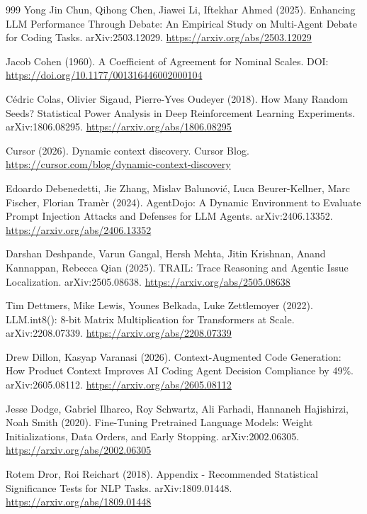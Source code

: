 \begin{thebibliography}{999}
 Yong Jin Chun, Qihong Chen, Jiawei Li, Iftekhar Ahmed (2025). Enhancing LLM Performance Through Debate: An Empirical Study on Multi-Agent Debate for Coding Tasks. arXiv:2503.12029. \url{https://arxiv.org/abs/2503.12029}

 Jacob Cohen (1960). A Coefficient of Agreement for Nominal Scales. DOI: \url{https://doi.org/10.1177/001316446002000104}

 C\'{e}dric Colas, Olivier Sigaud, Pierre-Yves Oudeyer (2018). How Many Random Seeds? Statistical Power Analysis in Deep Reinforcement Learning Experiments. arXiv:1806.08295. \url{https://arxiv.org/abs/1806.08295}

 Cursor (2026). Dynamic context discovery. Cursor Blog. \url{https://cursor.com/blog/dynamic-context-discovery}

 Edoardo Debenedetti, Jie Zhang, Mislav Balunovi\'{c}, Luca Beurer-Kellner, Marc Fischer, Florian Tram\`{e}r (2024). AgentDojo: A Dynamic Environment to Evaluate Prompt Injection Attacks and Defenses for LLM Agents. arXiv:2406.13352. \url{https://arxiv.org/abs/2406.13352}

 Darshan Deshpande, Varun Gangal, Hersh Mehta, Jitin Krishnan, Anand Kannappan, Rebecca Qian (2025). TRAIL: Trace Reasoning and Agentic Issue Localization. arXiv:2505.08638. \url{https://arxiv.org/abs/2505.08638}

 Tim Dettmers, Mike Lewis, Younes Belkada, Luke Zettlemoyer (2022). LLM.int8(): 8-bit Matrix Multiplication for Transformers at Scale. arXiv:2208.07339. \url{https://arxiv.org/abs/2208.07339}

 Drew Dillon, Kasyap Varanasi (2026). Context-Augmented Code Generation: How Product Context Improves AI Coding Agent Decision Compliance by 49\%. arXiv:2605.08112. \url{https://arxiv.org/abs/2605.08112}

 Jesse Dodge, Gabriel Ilharco, Roy Schwartz, Ali Farhadi, Hannaneh Hajishirzi, Noah Smith (2020). Fine-Tuning Pretrained Language Models: Weight Initializations, Data Orders, and Early Stopping. arXiv:2002.06305. \url{https://arxiv.org/abs/2002.06305}

 Rotem Dror, Roi Reichart (2018). Appendix - Recommended Statistical Significance Tests for NLP Tasks. arXiv:1809.01448. \url{https://arxiv.org/abs/1809.01448}


\end{thebibliography}
